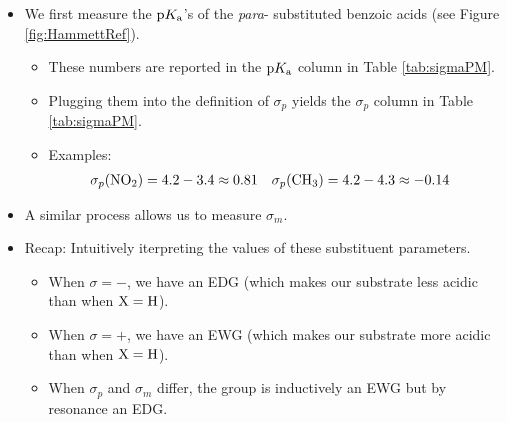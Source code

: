 \documentclass[../notes.tex]{subfiles}
\begin{document}
\begin{itemize}
\begin{itemize}
        \item We first measure the $\textup{p}K_\textup{a}$'s of the \emph{para}- substituted benzoic acids (see Figure \ref{fig:HammettRef}).
        \begin{itemize}
            \item These numbers are reported in the $\textup{p}K_\textup{a}$ column in Table \ref{tab:sigmaPM}.
            \item Plugging them into the definition of $\sigma_p$ yields the $\sigma_p$ column in Table \ref{tab:sigmaPM}.
            \item Examples:
            \begin{align*}
                \sigma_p(\ce{NO2}) &= 4.2-3.4 \approx 0.81&
                \sigma_p(\ce{CH3}) &= 4.2-4.3 \approx -0.14
            \end{align*}
        \end{itemize}
        \item A similar process allows us to measure $\sigma_m$.
        \item Recap: Intuitively iterpreting the values of these substituent parameters.
        \begin{itemize}
            \item When $\sigma=-$, we have an EDG (which makes our substrate less acidic than when $\ce{X}=\ce{H}$).
            \item When $\sigma=+$, we have an EWG (which makes our substrate more acidic than when $\ce{X}=\ce{H}$).
            \item When $\sigma_p$ and $\sigma_m$ differ, the group is inductively an EWG but by resonance an EDG.

\end{itemize}
\end{itemize}
\end{itemize}
\end{document}
